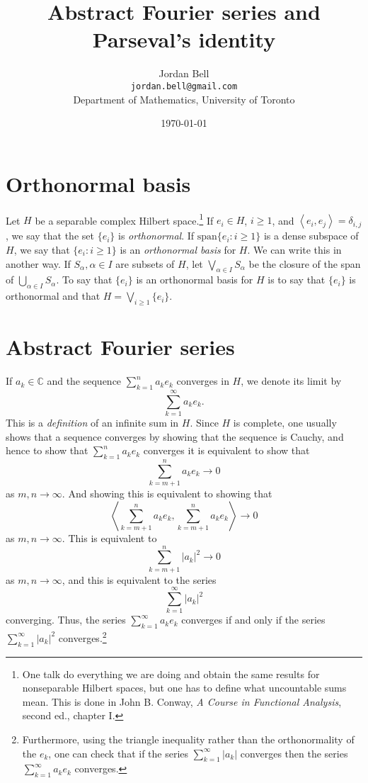 \documentclass{article}
\newcommand{\inner}[2]{\left\langle #1, #2 \right\rangle}
\newcommand{\Span}{\textrm{span}}
\begin{document}
\title{Abstract Fourier series and Parseval's identity}
\author{Jordan Bell\\ \texttt{jordan.bell@gmail.com}\\Department of Mathematics, University of Toronto}
\date{\today}
\maketitle

\section{Orthonormal basis}
Let $H$ be a separable complex Hilbert space.\footnote{One talk do everything we are doing and obtain the same results for nonseparable Hilbert spaces, but
one has to define what uncountable sums mean. This is done in John B. Conway, {\em A Course in Functional Analysis}, second ed., chapter I.}
 If $e_i \in H$, $i \geq 1$, and $\inner{e_i}{e_j}=\delta_{i,j}$, we say that the set $\{e_i\}$ is {\em orthonormal}. If
$\Span\{e_i: i \geq 1\}$ is a dense subspace of $H$, we say that $\{e_i: i \geq 1\}$ is an {\em orthonormal basis} for $H$. 
We can write this in another way. If $S_\alpha, \alpha \in I$ are subsets of $H$, let $\bigvee_{\alpha \in I} S_\alpha$ be the closure of the span of 
$\bigcup_{\alpha \in I} S_\alpha$. To say that $\{e_i\}$ is an orthonormal basis for $H$ is to say that $\{e_i\}$ is orthonormal and that
$H=\bigvee_{i \geq 1} \{e_i\}$.

\section{Abstract Fourier series}
If $a_k \in \mathbb{C}$ and the sequence
$\sum_{k=1}^n a_k e_k$ converges in $H$, we denote its limit by
\[
\sum_{k=1}^\infty a_k e_k.
\]
This is a {\em definition} of an infinite sum in $H$. Since $H$ is complete, one usually shows that a sequence converges by showing that the sequence is Cauchy, and hence
to show that $\sum_{k=1}^n a_k e_k$ converges it is equivalent to show that
\[
\sum_{k=m+1}^n a_k e_k \to 0
\]
as $m,n \to \infty$. And showing this is equivalent to showing that
\[
\inner{\sum_{k=m+1}^n a_k e_k}{\sum_{k=m+1}^n a_k e_k} \to 0
\] 
as $m, n \to \infty$. This is equivalent to
\[
\sum_{k=m+1}^n |a_k|^2 \to 0
\]
as $m,n \to \infty$, and this is equivalent to the series
\[
\sum_{k=1}^\infty |a_k|^2
\]
converging. Thus, the series $\sum_{k=1}^\infty a_k e_k$ converges if and only if the series $\sum_{k=1}^\infty |a_k|^2$ converges.\footnote{Furthermore, using the triangle
inequality rather than the orthonormality of the $e_k$, one can check that if
the series $\sum_{k=1}^\infty |a_k|$ converges then the series $\sum_{k=1}^\infty a_k e_k$ converges.}
\end{document}
